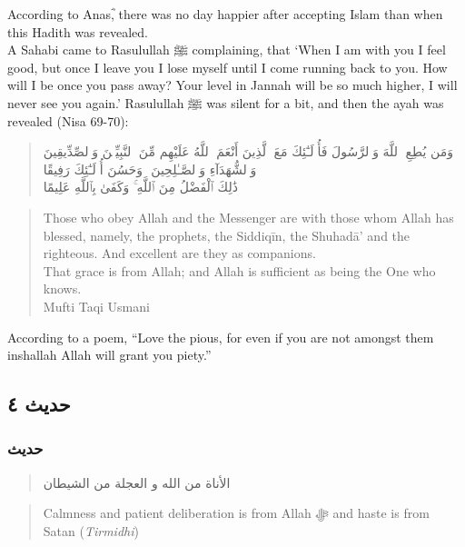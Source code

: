 \documentclass[
]{book}
\begin{document}
According to Anasؓ, there was no day happier after accepting Islam than when this Hadith was revealed.\\
A Sahabi came to Rasulullah ﷺ complaining, that `When I am with you I feel good, but once I leave you I lose myself until I come running back to you. How will I be once you pass away? Your level in Jannah will be so much higher, I will never see you again.' Rasulullah ﷺ was silent for a bit, and then the ayah was revealed (Nisa 69-70):

\begin{quote}
وَمَن يُطِعِ ٱللَّهَ وَٱلرَّسُولَ فَأُو۟لَـٰٓئِكَ مَعَ ٱلَّذِينَ أَنْعَمَ ٱللَّهُ عَلَيْهِم مِّنَ ٱلنَّبِيِّـۧنَ وَٱلصِّدِّيقِينَ وَٱلشُّهَدَآءِ وَٱلصَّـٰلِحِينَ ۚ وَحَسُنَ أُو۟لَـٰٓئِكَ رَفِيقًا\\
ذَٰلِكَ ٱلْفَضْلُ مِنَ ٱللَّهِ ۚ وَكَفَىٰ بِٱللَّهِ عَلِيمًا
\end{quote}

\begin{quote}
Those who obey Allah and the Messenger are with those whom Allah has blessed, namely, the prophets, the Siddiqīn, the Shuhadā' and the righteous. And excellent are they as companions.\\
That grace is from Allah; and Allah is sufficient as being the One who knows.\\
Mufti Taqi Usmani
\end{quote}

According to a poem, ``Love the pious, for even if you are not amongst them inshallah Allah will grant you piety.''

\hypertarget{ux62dux62fux64aux62b-ux664}{%
\subsection{حديث ٤}\label{ux62dux62fux64aux62b-ux664}}

\hypertarget{ux62dux62fux64aux62b-3}{%
\subsubsection{حديث}\label{ux62dux62fux64aux62b-3}}

\begin{quote}
الأناة من الله و العجلة من الشيطان
\end{quote}

\begin{quote}
Calmness and patient deliberation is from Allah ﷻ and haste is from Satan (\emph{Tirmidhi})
\end{quote}
\end{document}
